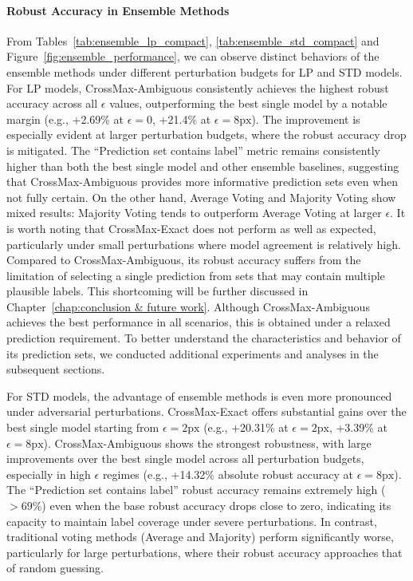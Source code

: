 \paragraph{Robust Accuracy in Ensemble Methods}
From Tables~\ref{tab:ensemble_lp_compact},  \ref{tab:ensemble_std_compact} and Figure~\ref{fig:ensemble_performance}, we can observe distinct behaviors of the ensemble methods under different perturbation budgets for LP and STD models. For LP models, CrossMax-Ambiguous consistently achieves the highest robust accuracy across all $\epsilon$ values, outperforming the best single model by a notable margin (e.g., +2.69\% at $\epsilon=0$, +21.4\% at $\epsilon=8\mathrm{px}$). The improvement is especially evident at larger perturbation budgets, where the robust accuracy drop is mitigated. The ``Prediction set contains label'' metric remains consistently higher than both the best single model and other ensemble baselines, suggesting that CrossMax-Ambiguous provides more informative prediction sets even when not fully certain. On the other hand, Average Voting and Majority Voting show mixed results: Majority Voting tends to outperform Average Voting at larger $\epsilon$.  
It is worth noting that CrossMax-Exact does not perform as well as expected, particularly under small perturbations where model agreement is relatively high. Compared to CrossMax-Ambiguous, its robust accuracy suffers from the limitation of selecting a single prediction from sets that may contain multiple plausible labels. This shortcoming will be further discussed in Chapter~\ref{chap:conclusion & future work}. Although CrossMax-Ambiguous achieves the best performance in all scenarios, this is obtained under a relaxed prediction requirement. To better understand the characteristics and behavior of its prediction sets, we conducted additional experiments and analyses in the subsequent sections.

For STD models, the advantage of ensemble methods is even more pronounced under adversarial perturbations. CrossMax-Exact offers substantial gains over the best single model starting from $\epsilon=2\mathrm{px}$ (e.g., +20.31\% at $\epsilon=2\mathrm{px}$, +3.39\% at $\epsilon=8\mathrm{px}$). CrossMax-Ambiguous shows the strongest robustness, with large improvements over the best single model across all perturbation budgets, especially in high $\epsilon$ regimes (e.g., +14.32\% absolute robust accuracy at $\epsilon=8\mathrm{px}$). The ``Prediction set contains label'' robust accuracy remains extremely high ($>69\%$) even when the base robust accuracy drops close to zero, indicating its capacity to maintain label coverage under severe perturbations. In contrast, traditional voting methods (Average and Majority) perform significantly worse, particularly for large perturbations, where their robust accuracy approaches that of random guessing.

